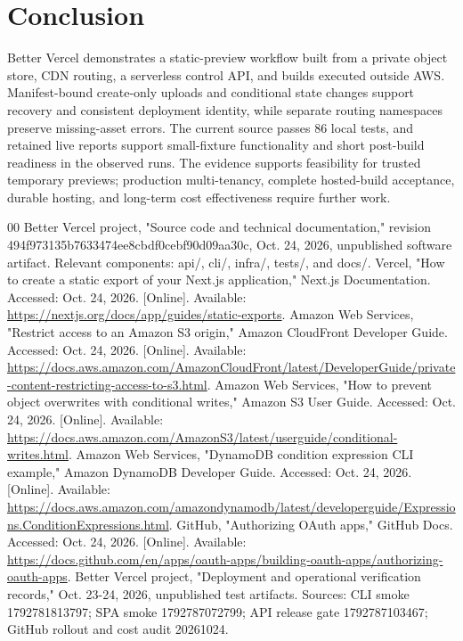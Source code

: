 \documentclass[conference,letterpaper]{IEEEtran}
\begin{document}
\section{Conclusion}
Better Vercel demonstrates a static-preview workflow built from a private object store, CDN routing, a serverless control API, and builds executed outside AWS. Manifest-bound create-only uploads and conditional state changes support recovery and consistent deployment identity, while separate routing namespaces preserve missing-asset errors. The current source passes 86 local tests, and retained live reports support small-fixture functionality and short post-build readiness in the observed runs. The evidence supports feasibility for trusted temporary previews; production multi-tenancy, complete hosted-build acceptance, durable hosting, and long-term cost effectiveness require further work.

\begin{thebibliography}{00}
 Better Vercel project, "Source code and technical documentation," revision 494f973135b7633474ee8cbdf0cebf90d09aa30c, Oct. 24, 2026, unpublished software artifact. Relevant components: api/, cli/, infra/, tests/, and docs/.
 Vercel, "How to create a static export of your Next.js application," Next.js Documentation. Accessed: Oct. 24, 2026. [Online]. Available: \url{https://nextjs.org/docs/app/guides/static-exports}.
 Amazon Web Services, "Restrict access to an Amazon S3 origin," Amazon CloudFront Developer Guide. Accessed: Oct. 24, 2026. [Online]. Available: \url{https://docs.aws.amazon.com/AmazonCloudFront/latest/DeveloperGuide/private-content-restricting-access-to-s3.html}.
 Amazon Web Services, "How to prevent object overwrites with conditional writes," Amazon S3 User Guide. Accessed: Oct. 24, 2026. [Online]. Available: \url{https://docs.aws.amazon.com/AmazonS3/latest/userguide/conditional-writes.html}.
 Amazon Web Services, "DynamoDB condition expression CLI example," Amazon DynamoDB Developer Guide. Accessed: Oct. 24, 2026. [Online]. Available: \url{https://docs.aws.amazon.com/amazondynamodb/latest/developerguide/Expressions.ConditionExpressions.html}.
 GitHub, "Authorizing OAuth apps," GitHub Docs. Accessed: Oct. 24, 2026. [Online]. Available: \url{https://docs.github.com/en/apps/oauth-apps/building-oauth-apps/authorizing-oauth-apps}.
 Better Vercel project, "Deployment and operational verification records," Oct. 23-24, 2026, unpublished test artifacts. Sources: CLI smoke 1792781813797; SPA smoke 1792787072799; API release gate 1792787103467; GitHub rollout and cost audit 20261024.
\end{thebibliography}
\end{document}
